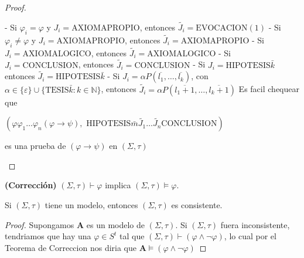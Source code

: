 \begin{proof}
\begin{enumerate}
      - Si $\varphi_{i}=\varphi $ y $J_{i}=\mathrm{AXIOMAPROPIO}$, entonces $\widetilde{J_{i}}=\mathrm{EVOCACION}(1)$
      - Si $\varphi_{i}\neq \varphi $ y $J_{i}=\mathrm{AXIOMAPROPIO}$, entonces $\widetilde{J_{i}}=\mathrm{AXIOMAPROPIO}$
      - Si $J_{i}=\mathrm{AXIOMALOGICO}$, entonces $\widetilde{J_{i}}= \mathrm{AXIOMALOGICO}$
      - Si $J_{i}=\mathrm{CONCLUSION}$, entonces $\widetilde{J_{i}}=\mathrm{ CONCLUSION}$
      - Si $J_{i}=\mathrm{HIPOTESIS}\bar{k}$ entonces $\widetilde{J_{i}}= \mathrm{HIPOTESIS}\bar{k}$
      - Si $J_{i}=\alpha P(\overline{l_{1}}, \dotsc, \overline{l_{k}})$, con $ \alpha \in \{\varepsilon \}\cup \{\mathrm{TESIS}\bar{k}:k\in \mathbb{N}\}$, entonces $\widetilde{J_{i}}=\alpha P(\overline{l_{1}+1}, \dotsc, \overline{l_{k}+1 })$
      Es facil chequear que

      $\displaystyle (\varphi \varphi_{1}\dotsc\varphi_{n}(\varphi \rightarrow \psi ),\text{ HIPOTESIS}\bar{m}\widetilde{J_{1}}\dotsc\widetilde{J_{n}}\text{CONCLUSION}) $

      es una prueba de $(\varphi \rightarrow \psi )$ en $(\Sigma, \tau)$
    \end{enumerate}
  \end{proof}

  \begin{theorem} \label{theorem_72}
    \PN \textbf{(Corrección)} $(\Sigma, \tau) \vdash \varphi$ implica $(\Sigma, \tau) \models \varphi$.
  \end{theorem}

  \begin{corollary} \label{corollary_73}
    \PN Si $(\Sigma, \tau)$ tiene un modelo, entonces $(\Sigma, \tau)$ es consistente.
  \end{corollary}
  \begin{proof}
    Supongamos $\mathbf{A}$ es un modelo de $(\Sigma, \tau).$ Si $(\Sigma, \tau)$ fuera inconsistente, tendriamos que hay una $\varphi \in S^{t}$ tal que $ (\Sigma, \tau)\vdash (\varphi \wedge \lnot \varphi )$, lo cual por el Teorema de Correccion nos diria que $\mathbf{A}\models (\varphi \wedge \lnot \varphi )$
  \end{proof}

